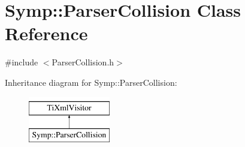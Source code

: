 \hypertarget{struct_symp_1_1_parser_collision}{\section{Symp\-:\-:Parser\-Collision Class Reference}
\label{struct_symp_1_1_parser_collision}
}


{\ttfamily \#include $<$Parser\-Collision.\-h$>$}

Inheritance diagram for Symp\-:\-:Parser\-Collision\-:\begin{figure}[H]
\begin{center}
\leavevmode
\includegraphics[height=2.000000cm]{struct_symp_1_1_parser_collision}
\end{center}
\end{figure}
